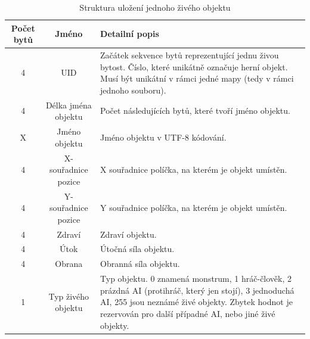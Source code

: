 \documentclass[11pt,a4paper]{scrartcl}
\begin{document}
	\begin{table}[H]
		\centering
		\begin{tabular}{|c|c|p{8cm}|}
			\hline
			Počet bytů & Jméno & Detailní popis \\
			\hline
			\hline
			4 & UID & Začátek sekvence bytů reprezentující jednu živou bytost. Číslo, které unikátně označuje herní objekt. Musí být unikátní v rámci jedné mapy (tedy v rámci jednoho souboru). \\
			\hline
			4 & Délka jména objektu & Počet následujících bytů, které tvoří jméno objektu. \\
			\hline
			X & Jméno objektu & Jméno objektu v UTF-8 kódování. \\
			\hline
			4 & X-souřadnice pozice & X souřadnice políčka, na kterém je objekt umístěn. \\
			\hline
			4 & Y-souřadnice pozice & Y souřadnice políčka, na kterém je objekt umístěn. \\
			\hline
			4 & Zdraví & Zdraví objektu. \\
			\hline
			4 & Útok & Útočná síla objektu. \\
			\hline
			4 & Obrana & Obranná síla objektu. \\
			\hline
			1 & Typ živého objektu & Typ objektu. 0 znamená monstrum, 1 hráč-člověk, 2 prázdná AI (protihráč, který jen stojí), 3 jednoduchá AI, 255 jsou neznámé živé objekty. Zbytek hodnot je rezervován pro další případné AI, nebo jiné živé objekty. \\
			\hline
		\end{tabular}
		\caption{Struktura uložení jednoho živého objektu}
		\label{tab:bin-creature}
	\end{table}
	
\end{document}
